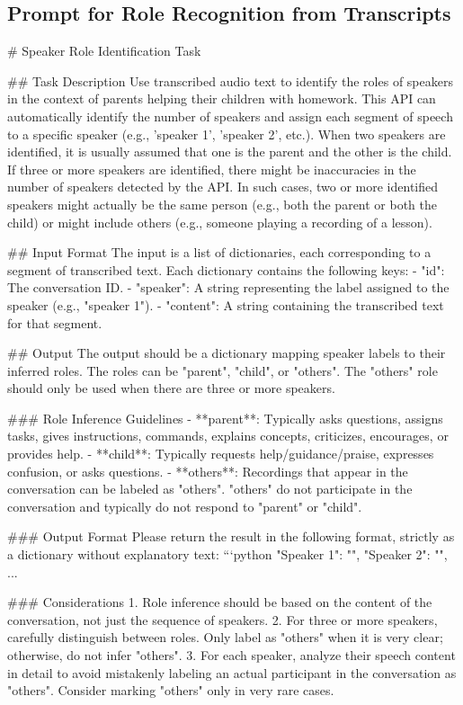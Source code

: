 \subsection{Prompt for Role Recognition from Transcripts}
\label{app: prompt_role recognition}
\begingroup
\footnotesize
\begin{spverbatim}
# Speaker Role Identification Task

## Task Description
Use transcribed audio text to identify the roles of speakers in the context of parents helping their children with homework. This API can automatically identify the number of speakers and assign each segment of speech to a specific speaker (e.g., 'speaker 1', 'speaker 2', etc.). When two speakers are identified, it is usually assumed that one is the parent and the other is the child. If three or more speakers are identified, there might be inaccuracies in the number of speakers detected by the API. In such cases, two or more identified speakers might actually be the same person (e.g., both the parent or both the child) or might include others (e.g., someone playing a recording of a lesson).

## Input Format
The input is a list of dictionaries, each corresponding to a segment of transcribed text. Each dictionary contains the following keys:
- "id": The conversation ID.
- "speaker": A string representing the label assigned to the speaker (e.g., "speaker 1").
- "content": A string containing the transcribed text for that segment.

## Output
The output should be a dictionary mapping speaker labels to their inferred roles. The roles can be "parent", "child", or "others". The "others" role should only be used when there are three or more speakers.

### Role Inference Guidelines
- **parent**: Typically asks questions, assigns tasks, gives instructions, commands, explains concepts, criticizes, encourages, or provides help.
- **child**: Typically requests help/guidance/praise, expresses confusion, or asks questions.
- **others**: Recordings that appear in the conversation can be labeled as "others". "others" do not participate in the conversation and typically do not respond to "parent" or "child".

### Output Format
Please return the result in the following format, strictly as a dictionary without explanatory text:
```python
{
    "Speaker 1": "",
    "Speaker 2": "",
    ...
}

### Considerations
1. Role inference should be based on the content of the conversation, not just the sequence of speakers.
2. For three or more speakers, carefully distinguish between roles. Only label as "others" when it is very clear; otherwise, do not infer "others".
3. For each speaker, analyze their speech content in detail to avoid mistakenly labeling an actual participant in the conversation as "others". Consider marking "others" only in very rare cases.

\end{spverbatim}
\endgroup
\normalsize


